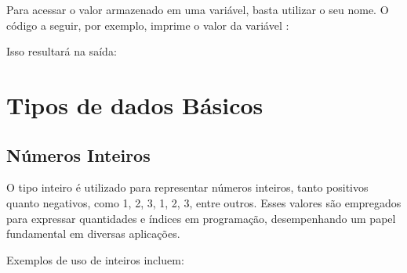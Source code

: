 \documentclass[letterpaper,10pt,english]{jupyterBook}
\begin{document}
\begin{sphinxVerbatim}[commandchars=\\\{\}]
  
\end{sphinxVerbatim}

\sphinxAtStartPar
Para acessar o valor armazenado em uma variável, basta utilizar o seu nome. O código a seguir, por exemplo, imprime o valor da variável :

\begin{sphinxVerbatim}[commandchars=\\\{\}]
\end{sphinxVerbatim}

\sphinxAtStartPar
Isso resultará na saída:

\begin{sphinxVerbatim}[commandchars=\\\{\}]
\end{sphinxVerbatim}


\section{Tipos de dados Básicos}
\label{\detokenize{chapters/ch2/ch2:tipos-de-dados-basicos}}

\subsection{Números Inteiros}
\label{\detokenize{chapters/ch2/ch2:numeros-inteiros}}
\sphinxAtStartPar
O tipo inteiro é utilizado para representar números inteiros, tanto positivos quanto negativos, como 1, 2, 3, \sphinxhyphen{}1, \sphinxhyphen{}2, \sphinxhyphen{}3, entre outros. Esses valores são empregados para expressar quantidades e índices em programação, desempenhando um papel fundamental em diversas aplicações.

\sphinxAtStartPar
Exemplos de uso de inteiros incluem:
\end{document}
